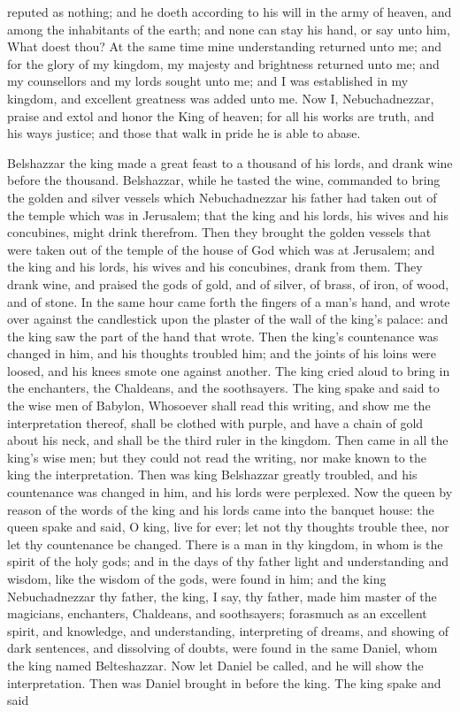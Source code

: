 reputed as nothing; and he doeth according to his will in the army of heaven, and among the inhabitants of the earth; and none can stay his hand, or say unto him, What doest thou? At the same time mine understanding returned unto me; and for the glory of my kingdom, my majesty and brightness returned unto me; and my counsellors and my lords sought unto me; and I was established in my kingdom, and excellent greatness was added unto me. Now I, Nebuchadnezzar, praise and extol and honor the King of heaven; for all his works are truth, and his ways justice; and those that walk in pride he is able to abase. 

Belshazzar the king made a great feast to a thousand of his lords, and drank wine before the thousand. Belshazzar, while he tasted the wine, commanded to bring the golden and silver vessels which Nebuchadnezzar his father had taken out of the temple which was in Jerusalem; that the king and his lords, his wives and his concubines, might drink therefrom. Then they brought the golden vessels that were taken out of the temple of the house of God which was at Jerusalem; and the king and his lords, his wives and his concubines, drank from them. They drank wine, and praised the gods of gold, and of silver, of brass, of iron, of wood, and of stone.  In the same hour came forth the fingers of a man’s hand, and wrote over against the candlestick upon the plaster of the wall of the king’s palace: and the king saw the part of the hand that wrote. Then the king’s countenance was changed in him, and his thoughts troubled him; and the joints of his loins were loosed, and his knees smote one against another. The king cried aloud to bring in the enchanters, the Chaldeans, and the soothsayers. The king spake and said to the wise men of Babylon, Whosoever shall read this writing, and show me the interpretation thereof, shall be clothed with purple, and have a chain of gold about his neck, and shall be the third ruler in the kingdom. Then came in all the king’s wise men; but they could not read the writing, nor make known to the king the interpretation. Then was king Belshazzar greatly troubled, and his countenance was changed in him, and his lords were perplexed.  Now the queen by reason of the words of the king and his lords came into the banquet house: the queen spake and said, O king, live for ever; let not thy thoughts trouble thee, nor let thy countenance be changed. There is a man in thy kingdom, in whom is the spirit of the holy gods; and in the days of thy father light and understanding and wisdom, like the wisdom of the gods, were found in him; and the king Nebuchadnezzar thy father, the king, I say, thy father, made him master of the magicians, enchanters, Chaldeans, and soothsayers; forasmuch as an excellent spirit, and knowledge, and understanding, interpreting of dreams, and showing of dark sentences, and dissolving of doubts, were found in the same Daniel, whom the king named Belteshazzar. Now let Daniel be called, and he will show the interpretation.  Then was Daniel brought in before the king. The king spake and said 